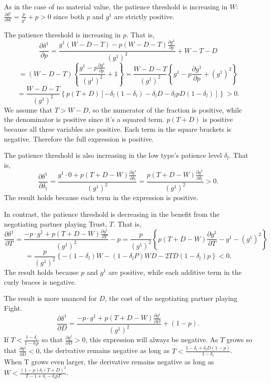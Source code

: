\documentclass[12pt, letterpaper]{article}
\newcommand{\de}{\delta}
\begin{document}
{As in the case of no material value, the patience threshold is increasing in $W$: $\frac{\partial \delta^1}{\partial W} = \frac{p}{g^1} + p > 0$ since both $p$ and $g^1$ are strictly positive.

The patience threshold is increasing in $p$. That is, 
$$\frac{\partial \delta^1}{\partial p} = \frac{g^1 (W-D-T) - p(W-D-T)\frac{\partial g^1}{\partial p}}{\left(g^1\right)^2}+ W-T-D$$$$= (W-D-T)\left\{\frac{g^1  - p\frac{\partial g^1}{\partial p}}{\left(g^1\right)^2}+ 1\right\}=\frac{W-D-T	}{(g^1)^2}\left\{g^1  - p\frac{\partial g^1}{\partial p} + (g^1)^2\right\}$$
$$=\frac{W-D-T}{(g^1)^2}\left\{p(T+D)\left[-\de_l (1-\de_l) - \de_l D - \de_l p D(1-\de_l)\right]\right\} > 0.$$
We assume that $T > W - D$, so the numerator of the fraction is positive, while the denominator is positive since it's a squared term. $p(T+D)$ is positive because all three variables are positive. Each term in the square brackets is negative. Therefore the full expression is positive.

The patience threshold is also increasing in the low type's patience level $\de_l$. That is,
$$\frac{\partial \delta^1}{\partial \de_l} = \frac{g^1 \cdot 0 + p(T+D-W)\frac{\partial g^1}{\partial \de_l}}{\left(g^1\right)^2} = \frac{p(T+D-W)\frac{\partial g^1}{\partial \de_l}}{\left(g^1\right)^2} > 0.$$
The result holds because each term in the expression is positive.

In contrast, the patience threshold is decreasing in the benefit from the negotiating partner playing Trust, $T$. That is,
$$\frac{\partial \delta^1}{\partial T} = \frac{-p \cdot g^1 + p(T+D-W) \frac{\partial g^1}{\partial T}}{(g^1)^2}-p = \frac{p}{(g^1)^2}\left\{ p(T+D-W) \frac{\partial g^1}{\partial T} - g^1 -(g^1)^2 \right\}$$
$$= \frac{p}{(g^1)^2}\left\{-(1-\de_l)W - (1- \de_l P)WD -2TD(1-\de_l)p \right\} < 0.$$
The result holds because $p$ and $g^1$ are positive, while each additive term in the curly braces is negative.

The result is more nuanced for $D$, the cost of the negotiating partner playing Fight. 
$$\frac{\partial \delta^1}{\partial D} = \frac{-p \cdot g^1 + p(T+D-W) \frac{\partial g^1}{\partial D}}{(g^1)^2}+ (1-p).$$
If $T < \frac{1-\de_l}{1-\de_l p}$ so that $\frac{\partial g^1}{\partial D} > 0$, this expression will always be negative. As $T$ grows so that $\frac{\partial g^1}{\partial D} < 0$, the derivative remains negative as long as $T < \frac{1-\de_l+ \de_lD(1-p)}{1-\de_l}$. When T grows even larger, the derivative remains negative as long as $W < \frac{(1-p)\de_l(T+D)^2}{T -1 + \de_l - \de_l p T}$.







}
\end{document}
